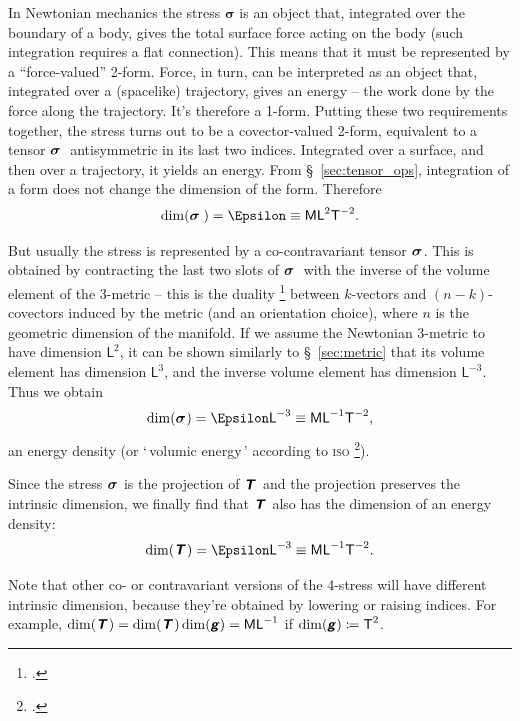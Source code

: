 \documentclass[\ifafour a4paper,12pt,\else a5paper,10pt,\fi%
onecolumn,oneside,article,%
british%
]{memoir}
\makeatletter
\newcommand*{\defquote}[1]{`\,#1\,'}
\theoremstyle{remark}
\theoremstyle{innote}
\newcommand*{\mathte}[1]{\textbf{\textit{\textsf{#1}}}}
\newcommand*{\citep}{\footcites}
\newcommand*{\defd}{\coloneqq}
\renewcommand*{\|}[1][]{\nonscript\,#1\vert\nonscript\;\mathopen{}}
\newcommand*{\sect}{\S}%
\newcommand*{\q}{}%
\DeclareRobustCommand*{\q}{%
  \mathbin{\mathpalette\bigcdot@{}}%
}
\newcommand*{\bigcdot@scalefactor}{0.75}
\newcommand*{\bigcdot@widthfactor}{1.5}
\newcommand*{\bigcdot@}[2]{%
  \sbox0{$#1\vcenter{}$}%
  \sbox2{$#1\cdot\m@th$}%
  \hbox to \bigcdot@widthfactor\wd2{%
    \hfil
    \raise\ht0\hbox{%
      \scalebox{\bigcdot@scalefactor}{%
        \lower\ht0\hbox{$#1\bullet\m@th$}%
      }%
    }%
    \hfil
  }%
}
\newcommand*{\Le}{\textsf{L}}
\newcommand*{\Ti}{\textsf{T}}
\newcommand*{\Ma}{\textsf{M}}
\newcommand*{\En}{\Epsilon}%
\newcommand*{\yg}{\mathte{g}}
\newcommand*{\yT}{\mathte{T}}
\renewcommand*{\i}{\indices}
\newcommand*{\yt}{\bm{\sigma}}
\makeatother
\begin{document}
In Newtonian mechanics the stress $\yt$ is an object that, integrated over
the boundary of a body, gives the total surface force acting on the body
(such integration requires a flat connection). This means that it must be
represented by a \enquote{force-valued} 2-form. Force, in turn, can be
interpreted as an object that, integrated over a (spacelike) trajectory,
gives an energy -- the work done by the force along the trajectory. It's
therefore a 1-form. Putting these two requirements together, the stress
turns out to be a covector-valued 2-form, equivalent to a tensor
$\yt\i{_{\q\;\q\q}}$ antisymmetric in its last two indices. Integrated over
a surface, and then over a trajectory, it yields an energy. From
\sect~\ref{sec:tensor_ops}, integration of a form does not change the
dimension of the form. Therefore
\begin{equation}
  \label{eq:dim_3stress_form}
  \dim(\yt\i{_{\q\;\q\q}}) = \En \equiv \Ma\Le^{2}\Ti^{-2}.
\end{equation}

But usually the stress is represented by a co-contravariant tensor
$\yt\i{_{\q}^{\q}}$. This is obtained by contracting the last two slots of
$\yt\i{_{\q\;\q\q}}$ with the inverse of the volume element of the 3-metric
-- this is the duality \citep[\sect~4.1.2]{bossavit1991} between
$k$-vectors and $(n-k)$-covectors induced by the metric (and an orientation
choice), where $n$ is the geometric dimension of the manifold. If we assume
the Newtonian 3-metric to have dimension $\Le^{2}$, it can be shown
similarly to \sect~\ref{sec:metric} that its volume element has dimension
$\Le^{3}$, and the inverse volume element has dimension $\Le^{-3}$. Thus we
obtain
\begin{equation}
  \label{eq:dim_3stress}
  \dim(\yt\i{_{\q}^{\q}}) = \En\Le^{-3} \equiv \Ma\Le^{-1}\Ti^{-2},
\end{equation}
an energy density (or \defquote{volumic energy} according to \textsc{iso}
\citep[item~A.6.2]{iso2009}).

Since the stress $\yt\i{_{\q}^{\q}}$ is the projection of
$\yT\i{_{\q}^{\q}}$ and the projection preserves the intrinsic dimension, we
finally find that $\yT\i{_{\q}^{\q}}$ also has the dimension of an energy density:
\begin{equation}
  \label{eq:dim_4stress}
  \dim(\yT\i{_{\q}^{\q}}) = \En\Le^{-3} \equiv \Ma\Le^{-1}\Ti^{-2}.
\end{equation}

Note that other co- or contravariant versions of the 4-stress will have
different intrinsic dimension, because they're obtained by lowering or
raising indices. For example,
$\dim(\yT\i{_{\q\q}})=\dim(\yT\i{_{\q}^{\q}})\dim(\yg)=\Ma\Le^{-1}$ if
$\dim(\yg)\defd \Ti^{2}$.
\end{document}
